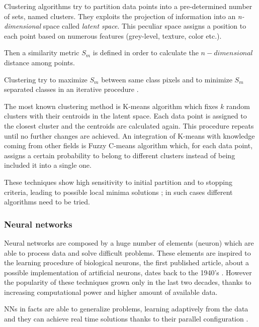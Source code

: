 \documentclass[../main.tex]{subfiles}
\begin{document}
Clustering algorithms try to partition data points into a pre-determined number of sets, named clusters.
They exploits the projection of information into an \textit{n-dimensional} space called \textit{latent space}\cite{automated_segm_tech}. 
This peculiar space assigns a position to each point based on numerous features (grey-level, texture, color etc.). 

Then a similarity metric $S_{m}$ is defined in order to calculate the $n-dimensional$ distance among points.

Clustering try to maximize $S_{m}$ between same class pixels and to minimize $S_{m}$ separated classes in an iterative procedure \cite{clustering}.

The most known clustering method is K-means algorithm \cite{k-means} which fixes $k$ random clusters with their centroids in the latent space. Each data point is assigned to the closest cluster and the centroids are calculated again. This procedure repeats until no further changes are achieved. An integration of K-means with knowledge coming from other fields is Fuzzy C-means algorithm \cite{fuzzy-c-means} which, for each data point, assigns a certain probability to belong to different clusters instead of being included it into a single one.

These techniques show high sensitivity to initial partition and to stopping criteria, leading to possible local minima solutions \cite{automated_segm_tech}; in such cases different algorithms need to be tried.

\subsubsection{{Neural networks}}

Neural networks are composed by a huge number of elements (neuron) which  are able to process data and solve difficult problems. These elements are inspired to the learning procedure of biological neurons, the first published article, about a possible implementation of artificial neurons, dates back to the 1940's \cite{mcculloch1943logical-neural-network}. However the popularity of these techniques grown only in the last two decades, thanks to increasing computational power and higher amount of available data. 

NNs in facts are able to generalize problems, learning adaptively from the data and they can achieve real time solutions thanks to their parallel configuration \cite{automated_segm_tech}.
\end{document}
